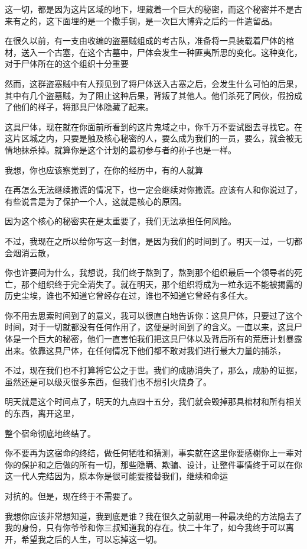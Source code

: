 这一切，都是因为这片区域的地下，埋藏着一个巨大的秘密，而这个秘密并不是古来有之的，这下面埋的是一个撒手锏，是一次巨大博弈之后的一件遣留品。

在很久以前，有一支由收编的盗墓贼组成的考古队，准备将一具装载着尸体的棺材，送入一个古塞，在这个古墓中，尸体会发生一种匪夷所思的变化。这种变化，对于尸体所在的这个组织十分重要

然而，这群盗塞贼中有人预见到了将尸体送入古塞之后，会发生什么可怕的后果，其中有几个盗墓贼，为了阻止这种后果，背叛了其他人。他们杀死了同伙，假扮成了他们的样子，将那具尸体隐藏了起来。

这具尸体，现在就在你面前所看到的这片鬼域之中，你千万不要试图去寻找它。在这片区城之内，只要是触及核心秘密的人，要么成为我们的一员，要么，就会被无情地抹杀掉。就算你是这个计划的最初参与者的孙子也是一样。

我想，你也应该察觉到了，在你的经历中，有的人就算

在再怎么无法继续撒谎的情况下，也一定会继续对你撒谎。应该有人和你说过了，有些说言是为了保护一个人，这就是核心的原因。

因为这个核心的秘密实在是太重要了，我们无法承担任何风险。

不过，我现在之所以给你写这一封信，是因为我们的时间到了。明天一过，一切都会烟消云散，

你也许要问为什么，我想说，我们终于熬到了，熬到那个组织最后一个领导者的死亡，那个组织终于完全消失了。就在明天，那个组织将成为一粒永远不能被揭露的历史尘埃，谁也不知道它曾经存在过，谁也不知道它曾经有多任大。

你不用去思索时间到了的意义，我可以很直白地告诉你：这具尸体，只要过了这个时间，对于一切就都没有任何作用了，这便是时间到了的含义。一直以来，这具尸体是一个巨大的秘密，他们一直害怕我们把这具尸体以及背后所有的荒唐计划暴露出来。依靠这具尸体，在任何情况下他们都不敢对我们进行最大力量的捕杀，

不过，现在我们也不打算将它公之于世。我们的成胁消失了，那么，成胁的证据，虽然还是可以级灭很多东西，但我们也不想引火烧身了。

明天就是这个时间点了，明天的九点四十五分，我们就会毁掉那具棺材和所有相关的东西，离开这里，

整个宿命彻底地终结了。

你不要再为这宿命的终结，做任何牺牲和猜测，事实就在这里你要感榭你上一辈对你的保护和之后做的所有一切，那些隐瞒、欺骗、设计，让整件事情终于可以在你这一代人完结因为，原本你是很可能要接替我们，继续和命运

对抗的。但是，现在终于不需要了。

我想你应该非常想知道，我到底是谁？我在很久之前就用一种最决绝的方法隐去了我的身份，只有你爷爷和你三叔知道我的存在。快二十年了，如今我终于可以离开，希望我之后的人生，可以忘掉这一切。

